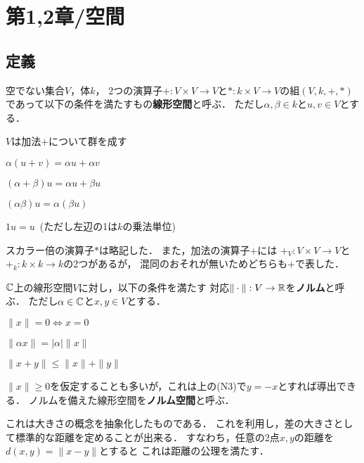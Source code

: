     \section{第1,2章/空間}
    \subsection{定義}
        \begin{Def}
            空でない集合$V$，体$k$，
            2つの演算子$+:V \times V \to V$と$\ast: k \times V \to V$の組$(V,k,+,\ast)$
            であって以下の条件を満たすもの\textbf{線形空間}と呼ぶ．
            ただし$\alpha, \beta \in k$と$u,v \in V$とする．
            \begin{description}
                \setlength{\leftskip}{0.5truecm}
                \item[V1] $V$は加法$+$について群を成す
                \item[V2] $\alpha(u+v)=\alpha u+\alpha v$
                \item[V3] $(\alpha+\beta)u=\alpha u+\beta u$
                \item[V4] $(\alpha \beta)u=\alpha (\beta u)$
                \item[V5] $1 u=u$~(ただし左辺の1は$k$の乗法単位)
            \end{description}
            スカラー倍の演算子$\ast$は略記した．
            また，加法の演算子+には
            $+_{V}:V \times V \to V$と$+_{k}: k \times k \to k$の2つがあるが，
            混同のおそれが無いためどちらも+で表した．
        \end{Def}

        \begin{Def}
            $\mathbb{C}$上の線形空間$V$に対し，以下の条件を満たす
            対応$\| \cdot \|: V \to \mathbb{R} $を\textbf{ノルム}と呼ぶ．
            ただし$\alpha \in \mathbb{C}$と$x, y \in V$とする．
            \begin{description}
                \setlength{\leftskip}{0.5truecm}
                \item[N1] $\|x\|=0 \iff x=0$
                \item[N2] $\|\alpha x\| =|\alpha| \|x\|$
                \item[N3] $\|x+y\| \leq \|x\|+\|y\|$
            \end{description}
            $\|x\| \geq 0$を仮定することも多いが，これは上の(N3)で$y=-x$とすれば導出できる．
            ノルムを備えた線形空間を\textbf{ノルム空間}と呼ぶ．
        \end{Def}
        これは大きさの概念を抽象化したものである．
        これを利用し，差の大きさとして標準的な距離を定めることが出来る．
        すなわち，任意の2点$x,y$の距離を$d(x,y)=\|x-y\|$とすると
        これは距離の公理を満たす．

